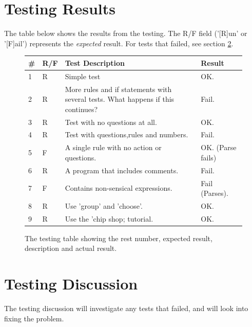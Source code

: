 \documentclass[12pt]{report}
\begin{document}
\section{Testing Results}\label{sec:testing_results}
The table below shows the results from the testing.  The R/F field ('[R]un' or '[F]ail') represents the \textit{expected} result.  For tests that failed, see section \ref{sec:testing_discussion}.
\begin{figure}[H]
	\begin{tabular}{| l | l | p{270pt} | p{110pt} |}
		\hline
		\textbf{\#} & \textbf{R/F} & \textbf{Test Description} & \textbf{Result} \\ \hline
		1 & R & Simple test & OK. \\ \hline
		2 & R & More rules and if statements with several tests. What happens if this continues? & Fail. \\ \hline
		3 & R & Test with no questions at all. & OK. \\ \hline
		4 & R & Test with questions,rules and numbers. & Fail. \\ \hline
		5 & F & A single rule with no action or questions. & OK. (Parse fails) \\ \hline
		6 & R & A program that includes comments. & Fail. \\ \hline
		7 & F & Contains non-sensical expressions. & Fail (Parses). \\ \hline
		8 & R & Use 'group' and 'choose'. & OK. \\ \hline
		9 & R & Use the 'chip shop; tutorial. & OK. \\ \hline
	\end{tabular}
	\caption{The testing table showing the rest number, expected result, description and actual result.}\label{fig:results_table}
\end{figure}
\section{Testing Discussion}\label{sec:testing_discussion}
The testing discussion will investigate any tests that failed, and will look into fixing the problem.
\end{document}
